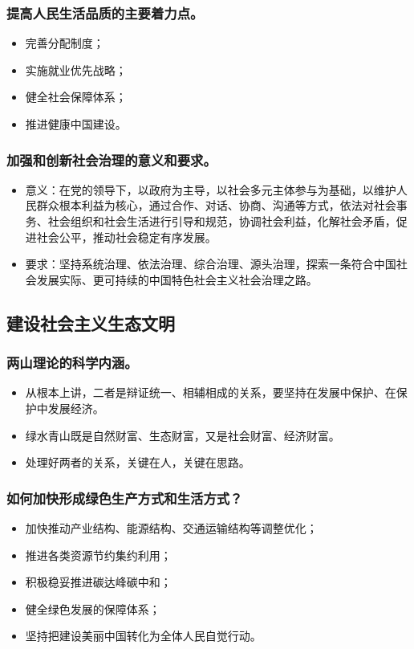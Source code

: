 \documentclass{article}
\begin{document}
\subsubsection{提高人民生活品质的主要着力点。}
\begin{itemize}
    \item 完善分配制度；
    \item 实施就业优先战略；
    \item 健全社会保障体系；
    \item 推进健康中国建设。
\end{itemize}

\subsubsection{加强和创新社会治理的意义和要求。}
\begin{itemize}
    \item 意义：在党的领导下，以政府为主导，以社会多元主体参与为基础，以维护人民群众根本利益为核心，通过合作、对话、协商、沟通等方式，依法对社会事务、社会组织和社会生活进行引导和规范，协调社会利益，化解社会矛盾，促进社会公平，推动社会稳定有序发展。
    \item 要求：坚持系统治理、依法治理、综合治理、源头治理，探索一条符合中国社会发展实际、更可持续的中国特色社会主义社会治理之路。
\end{itemize}

\subsection{建设社会主义生态文明}

\subsubsection{两山理论的科学内涵。}
\begin{itemize}
    \item 从根本上讲，二者是辩证统一、相辅相成的关系，要坚持在发展中保护、在保护中发展经济。
    \item 绿水青山既是自然财富、生态财富，又是社会财富、经济财富。
    \item 处理好两者的关系，关键在人，关键在思路。
\end{itemize}

\subsubsection{如何加快形成绿色生产方式和生活方式？}
\begin{itemize}
    \item 加快推动产业结构、能源结构、交通运输结构等调整优化；
    \item 推进各类资源节约集约利用；
    \item 积极稳妥推进碳达峰碳中和；
    \item 健全绿色发展的保障体系；
    \item 坚持把建设美丽中国转化为全体人民自觉行动。
\end{itemize}
\end{document}
